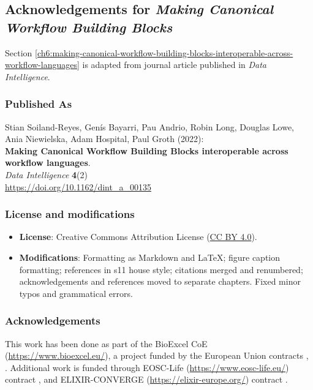 
\subsection{Acknowledgements for \emph{Making Canonical Workflow Building Blocks}}\label{ch11:canonical}

Section \vref{ch6:making-canonical-workflow-building-blocks-interoperable-across-workflow-languages} is adapted from journal article published in \emph{Data Intelligence}.

\subsubsection*{Published As}

Stian Soiland-Reyes, Genís Bayarri, Pau Andrio, Robin Long, Douglas
Lowe, Ania Niewielska, Adam Hospital, Paul Groth (2022):\\
\textbf{Making Canonical Workflow Building Blocks interoperable across
workflow languages}.\\
\emph{Data Intelligence} \textbf{4}(2)\\
\url{https://doi.org/10.1162/dint_a_00135}


\subsubsection*{License and modifications}

\begin{itemize}
\tightlist
\item
  \textbf{License}: Creative Commons Attribution License
  (\href{https://spdx.org/licenses/CC-BY-4.0}{CC BY 4.0}).
\item
  \textbf{Modifications}: Formatting as Markdown and LaTeX; figure caption
  formatting; references in s11 house style; citations merged and renumbered; 
  acknowledgements and references moved to separate chapters. 
  Fixed minor typos and grammatical errors.
\end{itemize}



\subsubsection*{Acknowledgements}

This work has been done as part of the BioExcel CoE
(\url{https://www.bioexcel.eu/}), a project funded by the European Union
contracts
,
. Additional work is funded through EOSC-Life
(\url{https://www.eosc-life.eu/}) contract
, and ELIXIR-CONVERGE (\url{https://elixir-europe.org/}) contract
.

